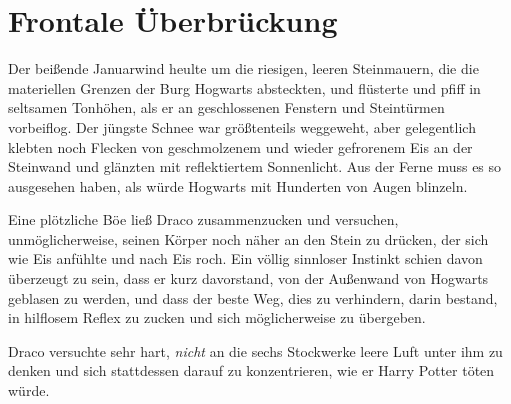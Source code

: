 \chapter{Frontale Überbrückung}

Der beißende Januarwind heulte um die riesigen, leeren Steinmauern, die die materiellen Grenzen der Burg Hogwarts absteckten, und flüsterte und pfiff in seltsamen Tonhöhen, als er an geschlossenen Fenstern und Steintürmen vorbeiflog. Der jüngste Schnee war größtenteils weggeweht, aber gelegentlich klebten noch Flecken von geschmolzenem und wieder gefrorenem Eis an der Steinwand und glänzten mit reflektiertem Sonnenlicht. Aus der Ferne muss es so ausgesehen haben, als würde Hogwarts mit Hunderten von Augen blinzeln.

Eine plötzliche Böe ließ Draco zusammenzucken und versuchen, unmöglicherweise, seinen Körper noch näher an den Stein zu drücken, der sich wie Eis anfühlte und nach Eis roch. Ein völlig sinnloser Instinkt schien davon überzeugt zu sein, dass er kurz davorstand, von der Außenwand von Hogwarts geblasen zu werden, und dass der beste Weg, dies zu verhindern, darin bestand, in hilflosem Reflex zu zucken und sich möglicherweise zu übergeben.

Draco versuchte sehr hart, \emph{nicht} an die sechs Stockwerke leere Luft unter ihm zu denken und sich stattdessen darauf zu konzentrieren, wie er Harry Potter töten würde.

